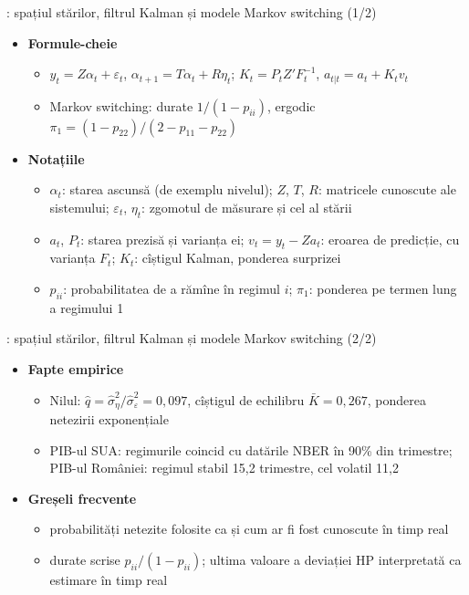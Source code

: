 \begin{frame}{: spațiul stărilor, filtrul Kalman și modele Markov switching (1/2)}
\itemsize{\footnotesize}
\begin{itemize}
    \item \textbf{Formule-cheie}
    \begin{itemize}
        \item $y_t = Z\alpha_t + \varepsilon_t$, $\alpha_{t+1} = T\alpha_t + R\eta_t$; $K_t = P_tZ'F_t^{-1}$, $a_{t|t} = a_t + K_tv_t$ 
        \item Markov switching: durate $1/(1 - p_{ii})$, ergodic $\pi_1 = (1 - p_{22})/(2 - p_{11} - p_{22})$ 
    \end{itemize}
    \item \textbf{Notațiile}
    \begin{itemize}
        \item $\alpha_t$: starea ascunsă (de exemplu nivelul); $Z$, $T$, $R$: matricele cunoscute ale sistemului; $\varepsilon_t$, $\eta_t$: zgomotul de măsurare și cel al stării
        \item $a_t$, $P_t$: starea prezisă și varianța ei; $v_t = y_t - Za_t$: eroarea de predicție, cu varianța $F_t$; $K_t$: cîștigul Kalman, ponderea surprizei
        \item $p_{ii}$: probabilitatea de a rămîne în regimul $i$; $\pi_1$: ponderea pe termen lung a regimului 1
    \end{itemize}
\end{itemize}
\end{frame}

\begin{frame}{: spațiul stărilor, filtrul Kalman și modele Markov switching (2/2)}
\itemsize{\footnotesize}
\begin{itemize}
    \item \textbf{Fapte empirice}
    \begin{itemize}
        \item Nilul: $\hat q = \hat\sigma^2_\eta/\hat\sigma^2_\varepsilon = 0{,}097$, cîștigul de echilibru $\bar K = 0{,}267$, ponderea netezirii exponențiale
        \item PIB-ul SUA: regimurile coincid cu datările NBER în 90\% din trimestre; PIB-ul României: regimul stabil 15{,}2 trimestre, cel volatil 11{,}2
    \end{itemize}
    \item \textbf{Greșeli frecvente}
    \begin{itemize}
        \item probabilități netezite folosite ca și cum ar fi fost cunoscute în timp real
        \item durate scrise $p_{ii}/(1 - p_{ii})$; ultima valoare a deviației HP interpretată ca estimare în timp real
    \end{itemize}
\end{itemize}
\end{frame}


